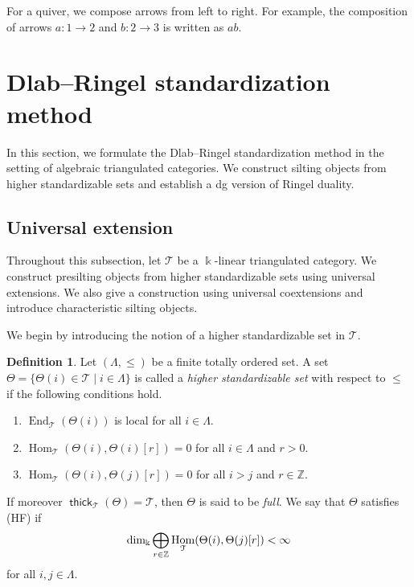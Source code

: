 \documentclass[a4paper,reqno,11pt]{amsart}
\numberwithin{equation}{section}
\theoremstyle{definition}
\newtheorem{definition}[theorem]{Definition}
\newcommand{\T}{\mathcal{T}}
\newcommand{\ZZ}{\mathbb{Z}}
\newcommand{\bte}{\Theta}
\newcommand{\kk}{\Bbbk}
\DeclareMathOperator{\thick}{\mathsf{thick}}
\DeclareMathOperator{\End}{End}
\DeclareMathOperator{\Hom}{Hom}
\begin{document}
For a quiver, we compose arrows from left to right.
For example, the composition of arrows $a\colon1\to2$ and $b\colon2\to3$ is written as $ab$.



\section{Dlab--Ringel standardization method}\label{section:DR_std_meth}

In this section, we formulate the Dlab--Ringel standardization method in the setting of algebraic triangulated categories. We construct silting objects from higher standardizable sets and establish a dg version of Ringel duality.



\subsection{Universal extension}\label{subsection:univ_ext}

Throughout this subsection, let $\T$ be a $\kk$-linear triangulated category.
We construct presilting objects from higher standardizable sets using universal extensions.
We also give a construction using universal coextensions and introduce characteristic silting objects.

We begin by introducing the notion of a higher standardizable set in $\T$.

\begin{definition}\label{def:hss}
Let $(\Lambda,\leq)$ be a finite totally ordered set.
A set $\bte=\{\bte(i) \in \T \mid i\in\Lambda\}$ is called a \emph{higher standardizable set} with respect to $\leq$ if the following conditions hold.
\begin{enumerate}
\item[(S1)] $\End_{\T}(\bte(i))$ is local for all $i\in\Lambda$.
\item[(S2)] $\Hom_{\T}(\bte(i),\bte(i)[r])=0$ for all $i\in\Lambda$ and $r>0$.
\item[(S3)] $\Hom_{\T}(\bte(i),\bte(j)[r])=0$ for all $i>j$ and $r\in\ZZ$.
\end{enumerate}
If moreover $\thick_{\T}(\bte)=\T$, then $\bte$ is said to be \emph{full}. 
We say that $\bte$ satisfies (HF) if 
\begin{align}
\dim_{\kk}\bigoplus_{r\in\ZZ} \Hom_{\T}(\bte(i),\bte(j)[r])<\infty\notag
\end{align}
for all $i,j\in \Lambda$.
\end{definition}
\end{document}
